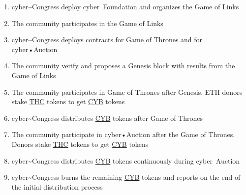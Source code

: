 \documentclass[8pt,oneside]{amsart}
\begin{document}
\begin{enumerate}
 \item cyber\~{}Congress deploy cyber~Foundation and organizes the Game of Links
 \item The community participates in the Game of Links
 \item cyber\~{}Congress deploys contracts for Game of Thrones and for cyber•Auction
 \item The community verify and proposes a Genesis block with results from the Game of Links
 \item The community participates in Game of Thrones after Genesis. ETH donors stake {\hyperref[thc]{THC}} tokens to get {\hyperref[cyb]{CYB}} tokens
 \item cyber\~{}Congress distributes {\hyperref[cyb]{CYB}} tokens after Game of Thrones
 \item The community participate in cyber•Auction after the Game of Thrones. Donors stake {\hyperref[thc]{THC}} tokens to get {\hyperref[cyb]{CYB}} tokens
 \item cyber\~{}Congress distributes {\hyperref[cyb]{CYB}} tokens continuously during cyber~Auction
 \item cyber\~{}Congress burns the remaining {\hyperref[cyb]{CYB}} tokens and reports on the end of the initial distribution process
\end{enumerate}
\end{document}
